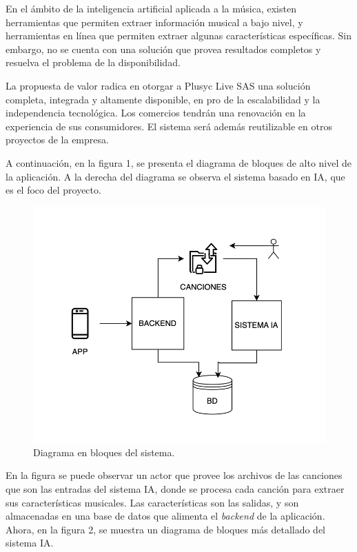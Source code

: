 \documentclass[
11pt, %
]{charter}
\begin{document}
En el ámbito de la inteligencia artificial aplicada a la música, existen herramientas que permiten extraer información musical a bajo nivel, y herramientas en línea que permiten extraer algunas características específicas. Sin embargo, no se cuenta con una solución que provea resultados completos y resuelva el problema de la disponibilidad.

La propuesta de valor radica en otorgar a Plusyc Live SAS una solución completa, integrada y altamente disponible, en pro de la escalabilidad y la independencia tecnológica. Los comercios tendrán una renovación en la experiencia de sus consumidores. El sistema será además reutilizable en otros proyectos de la empresa.

A continuación, en la figura 1, se presenta el diagrama de bloques de alto nivel de la aplicación. A la derecha del diagrama se observa el sistema basado en IA, que es el foco del proyecto. 


\begin{figure}[htpb]
\centering 
\includegraphics[width=.65\textwidth]{./Figuras/diagBloques.png}
\caption{Diagrama en bloques del sistema.}
\label{fig:diagBloques}
\end{figure}

\vspace{25px}
En la figura se puede observar un actor que provee los archivos de las canciones que son las entradas del sistema IA, donde se procesa cada canción para extraer sus características musicales. Las características son las salidas, y son almacenadas en una base de datos que alimenta el \textit{backend} de la aplicación. Ahora, en la figura 2, se muestra un diagrama de bloques más detallado del sistema IA. 
\end{document}
